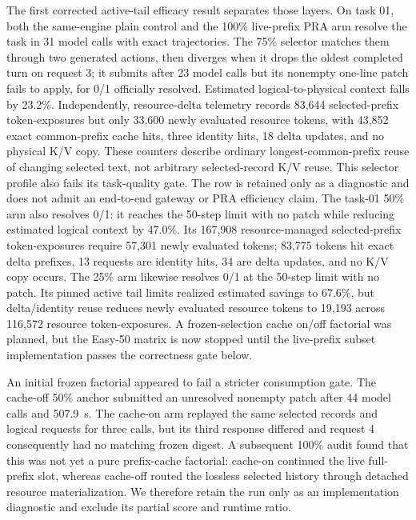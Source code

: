 \documentclass[11pt]{article}
\begin{document}
The first corrected active-tail efficacy result separates those layers. On
task 01, both the same-engine plain control and the 100\% live-prefix PRA arm
resolve the task in 31 model calls with exact trajectories. The 75\% selector
matches them through two generated actions, then diverges when it drops the
oldest completed turn on request 3; it submits after 23 model calls but its
nonempty one-line patch fails to apply, for 0/1 officially resolved. Estimated
logical-to-physical context falls by 23.2\%. Independently, resource-delta
telemetry records 83,644 selected-prefix token-exposures but only 33,600 newly
evaluated resource tokens, with 43,852 exact common-prefix cache hits, three
identity hits, 18 delta updates, and no physical K/V copy. These counters
describe ordinary longest-common-prefix reuse of changing selected text, not
arbitrary selected-record K/V reuse. This selector profile also fails its
task-quality gate. The row is retained only as a diagnostic and does not admit
an end-to-end gateway or PRA efficiency claim. The task-01
50\% arm also resolves 0/1: it reaches the 50-step limit with no patch while
reducing estimated logical context by 47.0\%. Its 167,908 resource-managed
selected-prefix token-exposures require 57,301 newly evaluated tokens; 83,775
tokens hit exact delta prefixes, 13 requests are identity hits, 34 are delta
updates, and no K/V copy occurs. The 25\% arm likewise resolves 0/1 at the
50-step limit with no patch. Its pinned active tail limits realized estimated
savings to 67.6\%, but delta/identity reuse reduces newly evaluated resource
tokens to 19,193 across 116,572 resource token-exposures. A frozen-selection
cache on/off factorial was planned, but the Easy-50 matrix is now stopped until
the live-prefix subset implementation passes the correctness gate below.

An initial frozen factorial appeared to fail a stricter consumption gate. The
cache-off 50\% anchor submitted an unresolved nonempty patch after 44 model
calls and 507.9~s. The cache-on arm replayed the same selected records and
logical requests for three calls, but its third response differed and request
4 consequently had no matching frozen digest. A subsequent 100\% audit found
that this was not yet a pure prefix-cache factorial: cache-on continued the
live full-prefix slot, whereas cache-off routed the lossless selected history
through detached resource materialization. We therefore retain the run only as
an implementation diagnostic and exclude its partial score and runtime ratio.
\end{document}
